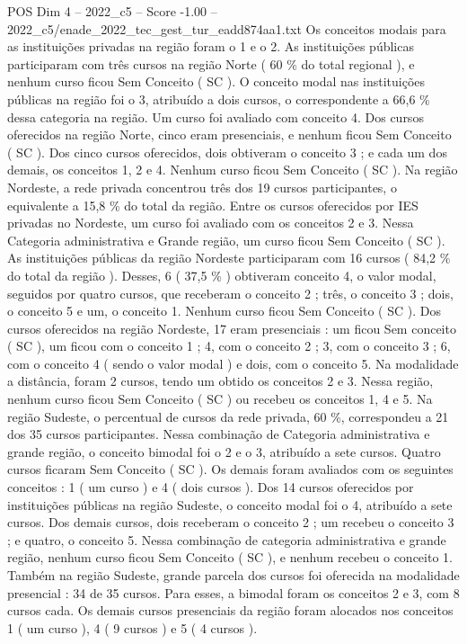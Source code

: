 \begin{textsample}{POS Dim 4 – 2022\_c5 – Score -1.00 – 2022\_c5/enade\_2022\_tec\_gest\_tur\_eadd874aa1.txt}
Os conceitos modais para as instituições privadas na região foram o 1 e o 2.
As instituições públicas participaram com três cursos na região Norte ( 60 \% do total regional ), e nenhum curso ficou Sem Conceito ( SC ).
O conceito modal nas instituições públicas na região foi o 3, atribuído a dois cursos, o correspondente a 66,6 \% dessa categoria na região.
Um curso foi avaliado com conceito 4.
Dos cursos oferecidos na região Norte, cinco eram presenciais, e nenhum ficou Sem Conceito ( SC ).
Dos cinco cursos oferecidos, dois obtiveram o conceito 3 ; e cada um dos demais, os conceitos 1, 2 e 4.
Nenhum curso ficou Sem Conceito ( SC ).
Na região Nordeste, a rede privada concentrou três dos 19 cursos participantes, o equivalente a 15,8 \% do total da região.
Entre os cursos oferecidos por IES privadas no Nordeste, um curso foi avaliado com os conceitos 2 e 3.
Nessa Categoria administrativa e Grande região, um curso ficou Sem Conceito ( SC ).
As instituições públicas da região Nordeste participaram com 16 cursos ( 84,2 \% do total da região ).
Desses, 6 ( 37,5 \% ) obtiveram conceito 4, o valor modal, seguidos por quatro cursos, que receberam o conceito 2 ; três, o conceito 3 ; dois, o conceito 5 e um, o conceito 1.
Nenhum curso ficou Sem Conceito ( SC ).
Dos cursos oferecidos na região Nordeste, 17 eram presenciais : um ficou Sem conceito ( SC ), um ficou com o conceito 1 ; 4, com o conceito 2 ; 3, com o conceito 3 ; 6, com o conceito 4 ( sendo o valor modal ) e dois, com o conceito 5.
Na modalidade a distância, foram 2 cursos, tendo um obtido os conceitos 2 e 3.
Nessa região, nenhum curso ficou Sem Conceito ( SC ) ou recebeu os conceitos 1, 4 e 5.
Na região Sudeste, o percentual de cursos da rede privada, 60 \%, correspondeu a 21 dos 35 cursos participantes.
Nessa combinação de Categoria administrativa e grande região, o conceito bimodal foi o 2 e o 3, atribuído a sete cursos.
Quatro cursos ficaram Sem Conceito ( SC ).
Os demais foram avaliados com os seguintes conceitos : 1 ( um curso ) e 4 ( dois cursos ).
Dos 14 cursos oferecidos por instituições públicas na região Sudeste, o conceito modal foi o 4, atribuído a sete cursos.
Dos demais cursos, dois receberam o conceito 2 ; um recebeu o conceito 3 ; e quatro, o conceito 5.
Nessa combinação de categoria administrativa e grande região, nenhum curso ficou Sem Conceito ( SC ), e nenhum recebeu o conceito 1.
Também na região Sudeste, grande parcela dos cursos foi oferecida na modalidade presencial : 34 de 35 cursos.
Para esses, a bimodal foram os conceitos 2 e 3, com 8 cursos cada.
Os demais cursos presenciais da região foram alocados nos conceitos 1 ( um curso ), 4 ( 9 cursos ) e 5 ( 4 cursos ).

\end{textsample}
